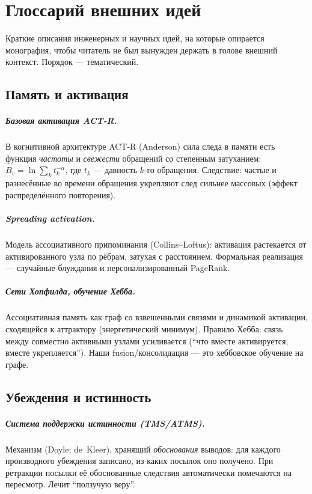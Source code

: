 \chapter{Глоссарий внешних идей}
\label{ch:glossary}

Краткие описания инженерных и научных идей, на которые опирается монография,
чтобы читатель не был вынужден держать в голове внешний контекст. Порядок
--- тематический.

\section*{Память и активация}

\paragraph{Базовая активация ACT-R.} В когнитивной архитектуре ACT-R
(Anderson) сила следа в памяти есть функция \emph{частоты} и \emph{свежести}
обращений со степенным затуханием:
$B_v=\ln\sum_k t_k^{-\alpha}$, где $t_k$ --- давность $k$-го обращения.
Следствие: частые и разнесённые во времени обращения укрепляют след сильнее
массовых (эффект распределённого повторения).

\paragraph{Spreading activation.} Модель ассоциативного припоминания
(Collins--Loftus): активация растекается от активированного узла по рёбрам,
затухая с расстоянием. Формальная реализация --- случайные блуждания и
персонализированный PageRank.

\paragraph{Сети Хопфилда, обучение Хебба.} Ассоциативная память как граф со
взвешенными связями и динамикой активации, сходящейся к аттрактору
(энергетический минимум). Правило Хебба: связь между совместно активными
узлами усиливается (``что вместе активируется, вместе укрепляется''). Наши
fusion/консолидация --- это хеббовское обучение на графе.

\section*{Убеждения и истинность}

\paragraph{Система поддержки истинности (TMS/ATMS).} Механизм (Doyle;
de~Kleer), хранящий \emph{обоснования} выводов: для каждого производного
убеждения записано, из каких посылок оно получено. При ретракции посылки её
обоснованные следствия автоматически помечаются на пересмотр. Лечит
``ползучую веру''.

